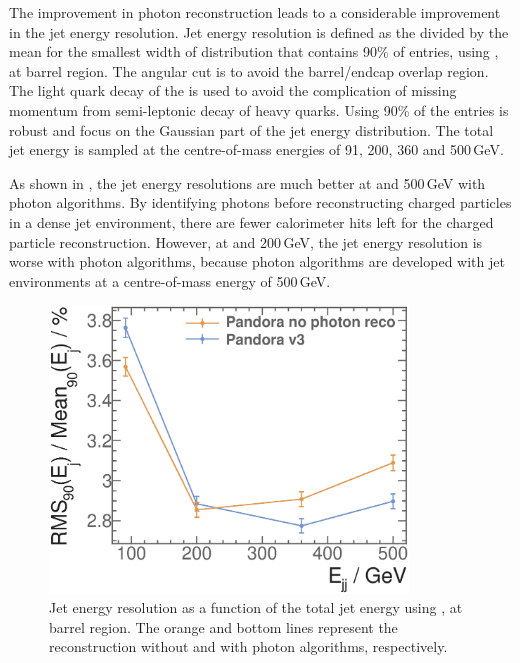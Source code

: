 The improvement in photon reconstruction leads to a considerable improvement in the jet energy resolution. Jet energy resolution is defined as the \rms divided by the mean for the smallest width of distribution that contains 90\% of entries, using \eeZuds, at barrel region. The angular cut is to avoid the barrel/endcap overlap region. The light quark decay of the \Zprime is used   to avoid the complication of missing momentum from semi-leptonic decay of heavy quarks. Using 90\% of the entries is robust and focus on the Gaussian part of the jet energy distribution. The total jet energy is sampled at the centre-of-mass energies of 91, 200, 360 and 500\,GeV.

As shown in , the jet energy resolutions are much better at  and 500\,GeV with photon algorithms. By identifying photons before reconstructing charged particles in a dense jet environment, there are fewer calorimeter hits left for the charged particle reconstruction. However, at  and 200\,GeV, the jet energy resolution is worse with photon algorithms, because photon algorithms are developed with  jet environments at a centre-of-mass energy of 500\,GeV.

\begin{figure}[tbph]
\centering
\includegraphics[width=0.85\textwidth]{photon/JERmuon.eps}
\caption[Jet energy resolution as a function of the total jet energy without and with photon related algorithms]
{Jet energy resolution as a function of the  total jet energy using \eeZuds,  at barrel region. The orange and bottom lines represent the reconstruction without and with photon algorithms, respectively.}
\label{fig:photonJERmuon}
\end{figure}


